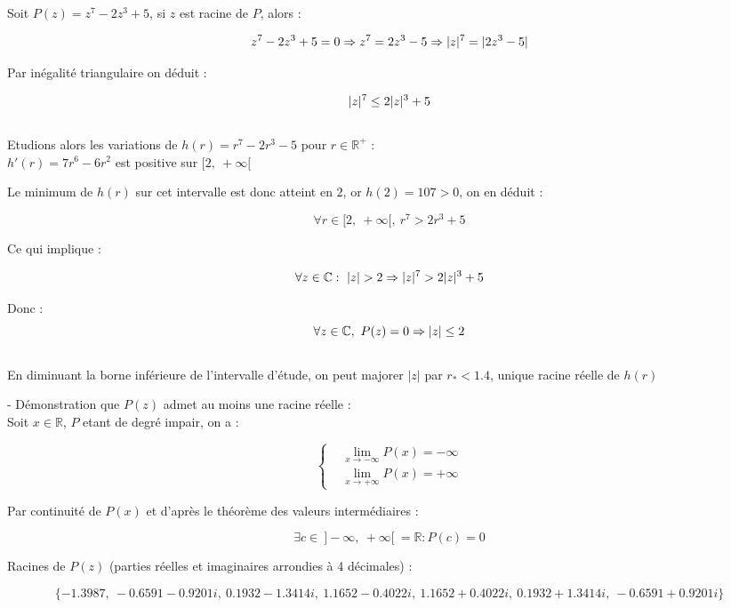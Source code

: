 \documentclass{article}
\DeclarePairedDelimiter\abs{\lvert}{\rvert}%
\begin{document}
Soit $P(z) = z^7 - 2z^3 + 5$, si $z$ est racine de $P$, alors :

$$z^7 - 2 z^3 + 5 = 0 \Rightarrow z^7 = 2z^3 - 5 \Rightarrow \abs{z}^7 = \abs{2z^3 - 5}$$

Par inégalité triangulaire on déduit :

$$\abs{z}^7 \leq 2\abs{z}^3 + 5$$ \\

Etudions alors les variations de $h(r) = r^7 - 2r^3 - 5$ pour $r \in \mathbb{R}^{+}$ : \\

$h'(r) = 7r^6 - 6r^2$ est positive sur $[2, \ +\infty[$

Le minimum de $h(r)$ sur cet intervalle est donc atteint en $2$, or $h(2) = 107 > 0$, on en déduit :

$$\forall r \in [2, \ +\infty[, \ r^7 > 2r^3 + 5$$

Ce qui implique :

$$\forall z \in \mathbb{C} : \abs{z} > 2 \Rightarrow \abs{z}^7 > 2 \abs{z}^3 + 5$$

Donc : 
$$\forall z \in \mathbb{C}, \ P(z) = 0 \Rightarrow \abs{z} \leq 2$$ \\

En diminuant la borne inférieure de l'intervalle d'étude, on peut majorer $|z|$ par $r_* < 1.4$, 
unique racine réelle de $h(r)$

- Démonstration que $P(z)$ admet au moins une racine réelle : \\

Soit $x \in \mathbb{R}$, $P$ etant de degré impair, on a :

\begin{equation*}
    \left \{
    \begin{aligned}
      & \lim_{x \to -\infty} P(x) = -\infty \\
      & \lim_{x \to +\infty} P(x) = +\infty
    \end{aligned} \right.
\end{equation*} 

Par continuité de $P(x)$ et d'après le théorème des valeurs intermédiaires :

$$\exists c \in \ ]-\infty, \ +\infty[ \ = \mathbb{R} : P(c) = 0$$ 

Racines de $P(z)$ (parties réelles et imaginaires arrondies à 4 décimales) :

$$\{-1.3987, \ -0.6591 - 0.9201i, \ 0.1932 - 1.3414i, \ 1.1652 - 0.4022i,
\ 1.1652 + 0.4022i, \ 0.1932 + 1.3414i, \ -0.6591 + 0.9201i\}$$
\end{document}
